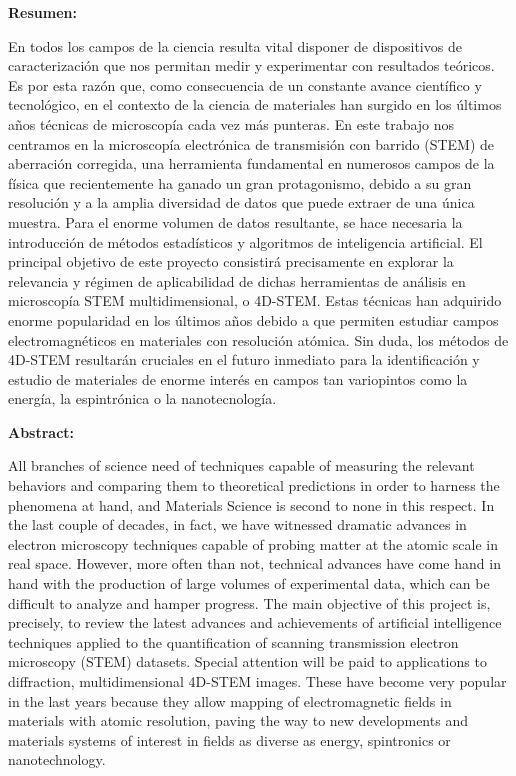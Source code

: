 
\newpage
\thispagestyle{empty} %

{\bfseries \large Resumen:} \vspace{5mm}

En todos los campos de la ciencia resulta vital disponer de dispositivos de caracterización que nos permitan medir y experimentar con resultados teóricos. Es por esta razón que, como consecuencia de un constante avance científico y tecnológico, en el contexto de la ciencia de materiales han surgido en los últimos años técnicas de microscopía cada vez más punteras. En este trabajo nos centramos en la microscopía electrónica de transmisión con barrido (STEM) de aberración corregida, una herramienta fundamental en numerosos campos de la física que recientemente ha ganado un gran protagonismo, debido a su gran resolución y a la amplia diversidad de datos que puede extraer de una única muestra. Para el enorme volumen de datos resultante, se hace necesaria la introducción de métodos estadísticos y algoritmos de inteligencia artificial. El principal objetivo de este proyecto consistirá precisamente en explorar la relevancia y régimen de aplicabilidad de dichas herramientas de análisis en microscopía STEM multidimensional, o 4D-STEM. Estas técnicas han adquirido enorme popularidad en los últimos años debido a que permiten estudiar campos electromagnéticos en materiales con resolución atómica. Sin duda, los métodos de 4D-STEM resultarán cruciales en el futuro inmediato para la identificación y estudio de materiales de enorme interés en campos tan variopintos como la energía, la espintrónica o la nanotecnología.

\vspace{1cm}

{\bfseries \large Abstract: }\vspace{5mm} 

All branches of science need of techniques capable of measuring the relevant behaviors and comparing them to theoretical predictions in order to harness the phenomena at hand, and Materials Science is second to none in this respect. In the last couple of decades, in fact, we have witnessed dramatic advances in electron microscopy techniques capable of probing matter at the atomic scale in real space. However, more often than not, technical advances have come hand in hand with the production of large volumes of experimental data, which can be difficult to analyze and hamper progress. The main objective of this project is, precisely, to review the latest advances and achievements of artificial intelligence techniques applied to the quantification of scanning transmission electron microscopy (STEM) datasets. Special attention will be paid to applications to diffraction, multidimensional 4D-STEM images. These have become very popular in the last years because they allow mapping of electromagnetic fields in materials with atomic resolution, paving the way to new developments and materials systems of interest in fields as diverse as energy, spintronics or nanotechnology.

\vspace{1cm}

